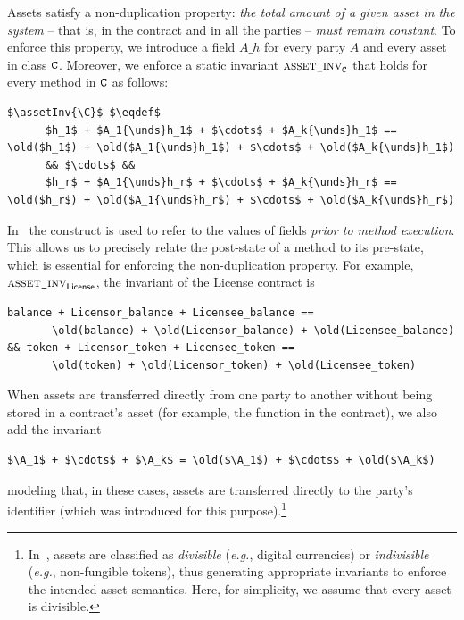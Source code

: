 Assets satisfy a non-duplication property: \emph{the total amount of a
  given asset in the system} -- that is, in the contract and in all
the parties -- \emph{must remain constant}.  To enforce this property,
we introduce a field $A\_h$ for every party $A$ and every asset
 in class $\tt C$. Moreover, we enforce a static invariant
$\mbox{{\sc asset}{\tt \_}{\sc inv}}_{\tt C}$ that holds for every method in $\tt C$ as follows:

{\small
\begin{lstlisting}[frame=none,numbers=none,language={[JML]Java}, mathescape=true]
 $\assetInv{\C}$ $\eqdef$ 
      $h_1$ + $A_1{\unds}h_1$ + $\cdots$ + $A_k{\unds}h_1$ == \old($h_1$) + \old($A_1{\unds}h_1$) + $\cdots$ + \old($A_k{\unds}h_1$)
      && $\cdots$ &&
      $h_r$ + $A_1{\unds}h_r$ + $\cdots$ + $A_k{\unds}h_r$ == \old($h_r$) + \old($A_1{\unds}h_r$) + $\cdots$ + \old($A_k{\unds}h_r$)
\end{lstlisting}
} 

In \JML\ the  construct is used to refer to the values of
fields \emph{prior to method execution}. This allows us to precisely
relate the post-state of a method to its pre-state, which is essential
for enforcing the non-duplication property.
%
For example, $\mbox{{\sc asset}{\tt \_}{\sc inv}}_{{\sf License}}$, the invariant of the {\sf
  License} contract is

{\footnotesize
\begin{lstlisting}[frame=none,numbers=none,language={[JML]Java},mathescape=true]
   balance + Licensor_balance + Licensee_balance ==
       \old(balance) + \old(Licensor_balance) + \old(Licensee_balance)
&& token + Licensor_token + Licensee_token ==
       \old(token) + \old(Licensor_token) + \old(Licensee_token)
\end{lstlisting}
}

When assets are transferred directly from one party to another without
being stored in a contract's asset (for example, the 
function in the  contract), we also add the invariant

{\small
\begin{lstlisting}[frame=none,numbers=none,language={[JML]Java}, mathescape=true]
   $\A_1$ + $\cdots$ + $\A_k$ = \old($\A_1$) + $\cdots$ + \old($\A_k$)
\end{lstlisting}
} 

\noindent
modeling that, in these cases, assets are transferred directly to the
party's identifier (which was introduced for this
purpose).\footnote{In~\cite{iFM25}, assets are classified as
  \emph{divisible} (\emph{e.g.}, digital currencies) or
  \emph{indivisible} (\emph{e.g.}, non-fungible tokens), thus
  generating appropriate invariants to enforce the intended asset
  semantics. Here, for simplicity, we assume that every asset is
  divisible.}

